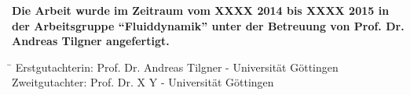 \documentclass[12pt,a4paper,headsepline,bibliography=totoc,idxtotoc,DIV12,openright,twoside=true,chapterprefix=on,draft]{scrbook} %
\theoremstyle{definition}
\theoremstyle{plain}
\begin{document}
\mbox{}
\thispagestyle{empty}
\newpage
\newpage
{}
\thispagestyle{empty}
\vfill
\noindent \textbf{Die Arbeit wurde im Zeitraum vom XXXX 2014 bis XXXX 2015 in der Arbeitsgruppe "`Fluiddynamik"'
 unter der Betreuung von Prof. Dr. Andreas Tilgner angefertigt. }\\
%
\vfill
\begin{tabbing}
  \hspace{3cm}\=\kill
   Erstgutachterin: \quad  Prof. Dr. Andreas Tilgner - Universität Göttingen\\
   Zweitgutachter: \quad  Prof. Dr. X Y - Universität Göttingen\\
\end{tabbing}

\newpage
\mbox{}
\thispagestyle{empty}
\newpage


\end{document}
